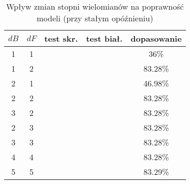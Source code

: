 \documentclass[11pt, a4paper]{article}
\begin{document}
\begin{table}[p!]
	\centering
	\begin{tabular}{c|c||c|c|c}
		$dB$ & $dF$ & 
			test skr. & test biał. & dopasowanie \\
		\hline\hline
		1 & 1 &
			\tak & \nie & 36\% \\
		\hline
		1 & 2 &
			\tak & \nie & 83.28\% \\
		\hline
		2 & 1 &
			\tak & \nie & 46.98\% \\
		\hline
		2 & 2 &
			\tak & \nie & 83.28\% \\
		\hline
		3 & 2 &
			\tak & \nie & 83.28\% \\
		\hline
		2 & 3 &
			\nie & \nie & 83.28\% \\
		\hline
		3 & 3 &
			\nie & \nie & 83.28\% \\
		\hline
		4 & 4 &
			\nie & \nie & 83.28\% \\
		\hline
		5 & 5 &
			\nie & \nie & 83.29\%
	\end{tabular}
	\caption{Wpływ zmian stopni wielomianów na poprawność modeli (przy stałym opóźnieniu)}
	\label{tbl:lin}
\end{table}
\end{document}
